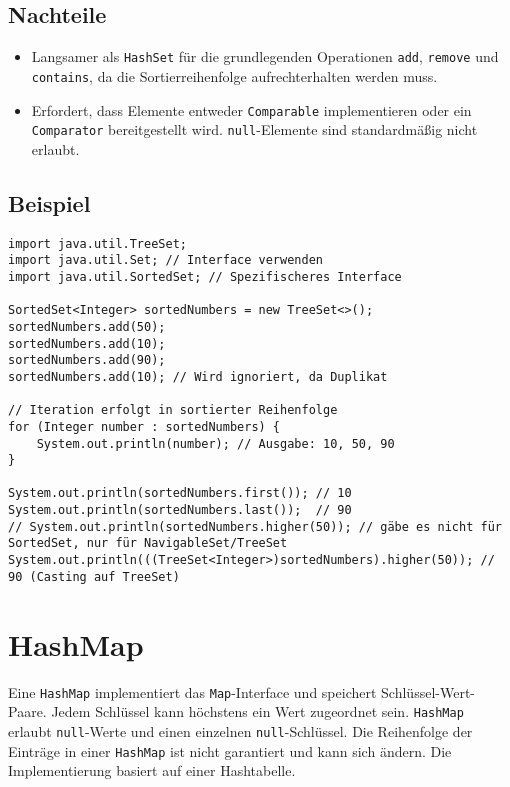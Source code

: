 \subsection{Nachteile}
\begin{itemize}
    \item Langsamer als \texttt{HashSet} für die grundlegenden Operationen \texttt{add},
          \texttt{remove} und \texttt{contains}, da die Sortierreihenfolge
          aufrechterhalten werden muss.
    \item Erfordert, dass Elemente entweder \texttt{Comparable} implementieren oder ein
          \texttt{Comparator} bereitgestellt wird. \texttt{null}-Elemente sind
          standardmäßig nicht erlaubt.
\end{itemize}

\subsection{Beispiel}
\begin{lstlisting}[caption={Beispiel für die Verwendung eines TreeSet in Java}, label=lst:treeSetExample]
import java.util.TreeSet;
import java.util.Set; // Interface verwenden
import java.util.SortedSet; // Spezifischeres Interface

SortedSet<Integer> sortedNumbers = new TreeSet<>();
sortedNumbers.add(50);
sortedNumbers.add(10);
sortedNumbers.add(90);
sortedNumbers.add(10); // Wird ignoriert, da Duplikat

// Iteration erfolgt in sortierter Reihenfolge
for (Integer number : sortedNumbers) {
    System.out.println(number); // Ausgabe: 10, 50, 90
}

System.out.println(sortedNumbers.first()); // 10
System.out.println(sortedNumbers.last());  // 90
// System.out.println(sortedNumbers.higher(50)); // gäbe es nicht für SortedSet, nur für NavigableSet/TreeSet
System.out.println(((TreeSet<Integer>)sortedNumbers).higher(50)); // 90 (Casting auf TreeSet)
\end{lstlisting}

\section{HashMap}
Eine \texttt{HashMap} implementiert das \texttt{Map}-Interface und speichert
Schlüssel-Wert-Paare. Jedem Schlüssel kann höchstens ein Wert zugeordnet sein.
\texttt{HashMap} erlaubt \texttt{null}-Werte und einen einzelnen
\texttt{null}-Schlüssel. Die Reihenfolge der Einträge in einer \texttt{HashMap}
ist nicht garantiert und kann sich ändern. Die Implementierung basiert auf
einer Hashtabelle.

